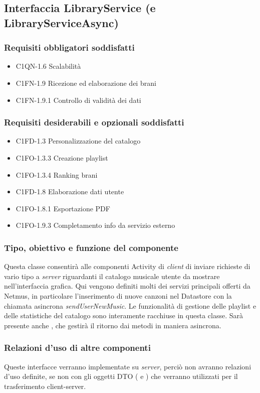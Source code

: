 \subsection{Interfaccia LibraryService (e LibraryServiceAsync)}
\subsubsection*{Requisiti obbligatori soddisfatti}
\begin{itemize}
    \item C1QN-1.6 Scalabilit\`a
    \item C1FN-1.9 Ricezione ed elaborazione dei brani
    \item C1FN-1.9.1 Controllo di validit\`a dei dati
\end{itemize}
\subsubsection*{Requisiti desiderabili e opzionali soddisfatti}
\begin{itemize}
    \item C1FD-1.3 Personalizzazione del catalogo
    \item C1FO-1.3.3 Creazione playlist
    \item C1FO-1.3.4 Ranking brani
    \item C1FD-1.8 Elaborazione dati utente
    \item C1FO-1.8.1 Esportazione PDF
    \item C1FO-1.9.3 Completamento info da servizio esterno
\end{itemize}
\subsubsection*{Tipo, obiettivo e funzione del componente}
Questa classe consentir\`a alle componenti Activity di \emph{client} di inviare
richieste di vario tipo a \emph{server} riguardanti il catalogo musicale utente
da mostrare nell'interfaccia grafica. Qui vengono definiti molti dei servizi
principali offerti da Netmus, in particolare l'inserimento di nuove canzoni nel
Datastore con la chiamata asincrona \emph{sendUserNewMusic}. Le
funzionalit\`a di gestione delle playlist e delle statistiche del
catalogo sono interamente racchiuse in questa classe. Sar\`a presente anche
, che gestir\`a il ritorno dai metodi in maniera asincrona. 
\subsubsection*{Relazioni d'uso di altre componenti}
Queste interfacce verranno implementate su \emph{server}, perci\`o non
avranno relazioni d'uso definite, se non con gli oggetti DTO
( e ) che verranno utilizzati per
il trasferimento client-server.
